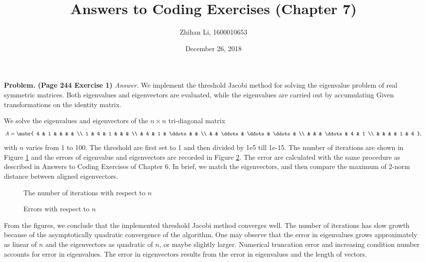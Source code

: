 \documentclass[english, nochinese]{pnote}
\title{Answers to Coding Exercises (Chapter 7)}
\author{Zhihan Li, 1600010653}
\date{December 26, 2018}
\begin{document}
\maketitle

\textbf{Problem. (Page 244 Exercise 1)} \textit{Answer.} We implement the threshold Jacobi method for solving the eigenvalue problem of real symmetric matrices. Both eigenvalues and eigenvectors are evaluated, while the eigenvalues are carried out by accumulating Given transformations on the identity matrix.

We solve the eigenvalues and eigenvectors of the $ n \times n $ tri-diagonal matrix
\begin{equation}
A = \msbr{ 4 & 1 & & & & \\ 1 & 4 & 1 & & & \\ & 4 & 1 & \ddots & & \\ & & \ddots & \ddots & \ddots & \\ & & & \ddots & 4 & 1 \\ & & & & 1 & 4 },
\end{equation}
with $n$ varies from 1 to 100. The threshold are first set to 1 and then divided by 1e5 till 1e-15. The number of iterations are shown in Figure \ref{Fig:Iter} and the errors of eigenvalue and eigenvectors are recorded in Figure \ref{Fig:Err}. The error are calculated with the same procedure as described in Answers to Coding Exercises of Chapter 6. In brief, we match the eigenvectors, and then compare the maximum of 2-norm distance between aligned eigenvectors.

\begin{figure}[htbp]
\centering

\caption{The number of iterations with respect to $n$}
\label{Fig:Iter}
\end{figure}

\begin{figure}[htbp]
\centering

\caption{Errors with respect to $n$}
\label{Fig:Err}
\end{figure}

From the figures, we conclude that the implemented threshold Jacobi method converges well. The number of iterations has slow growth because of the asymptotically quadratic convergence of the algorithm. One may observe that the error in eigenvalues grows approximately as linear of $n$ and the eigenvectors as quadratic of $n$, or maybe slightly larger. Numerical truncation error and increasing condition number accounts for error in eigenvalues. The error in eigenvectors results from the error in eigenvalues and the length of vectors.
\end{document}
